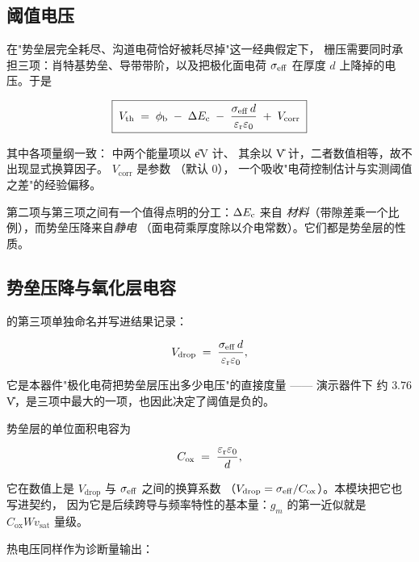 \subsection{阈值电压}
\label{sec:fom-vth}

在"势垒层完全耗尽、沟道电荷恰好被耗尽掉"这一经典假定下，
栅压需要同时承担三项：肖特基势垒、导带带阶，以及把极化面电荷
$\sigma_{\mathrm{eff}}$ 在厚度 $d$ 上降掉的电压。于是

\begin{equation}
\boxed{\;
V_{\text{th}} \;=\; \phi_{\mathrm{b}} \;-\; \Delta E_{\mathrm{c}} \;-\;
\frac{\sigma_{\mathrm{eff}}\,d}{\varepsilon_{\mathrm{r}}\varepsilon_{0}}
\;+\; V_{\text{corr}}
\;}
\label{eq:fom-vth}
\end{equation}

其中各项量纲一致： 中两个能量项以 \U{eV} 计、
其余以 \U{V} 计，二者数值相等，故不出现显式换算因子。
$V_{\text{corr}}$ 是参数 （默认 $0$），
一个吸收"电荷控制估计与实测阈值之差"的经验偏移。

第二项与第三项之间有一个值得点明的分工：$\Delta E_{\mathrm{c}}$ 来自
\emph{材料}（带隙差乘一个比例），而势垒压降来自\emph{静电}
（面电荷乘厚度除以介电常数）。它们都是势垒层的性质。

\subsection{势垒压降与氧化层电容}
\label{sec:fom-cox}

 的第三项单独命名并写进结果记录：

\begin{equation}
V_{\text{drop}} \;=\; \frac{\sigma_{\mathrm{eff}}\,d}{\varepsilon_{\mathrm{r}}\varepsilon_{0}},
\label{eq:fom-drop}
\end{equation}

它是本器件"极化电荷把势垒层压出多少电压"的直接度量 —— 演示器件下
约 $3.76$\U{V}，是三项中最大的一项，也因此决定了阈值是负的。

势垒层的单位面积电容为

\begin{equation}
C_{\text{ox}} \;=\; \frac{\varepsilon_{\mathrm{r}}\varepsilon_{0}}{d},
\label{eq:fom-cox}
\end{equation}

它在数值上是 $V_{\text{drop}}$ 与 $\sigma_{\mathrm{eff}}$ 之间的换算系数
（$V_{\text{drop}}=\sigma_{\mathrm{eff}}/C_{\text{ox}}$）。本模块把它也写进契约，
因为它是后续跨导与频率特性的基本量：$g_m$ 的第一近似就是
$C_{\text{ox}}W v_{\text{sat}}$ 量级。

热电压同样作为诊断量输出：

